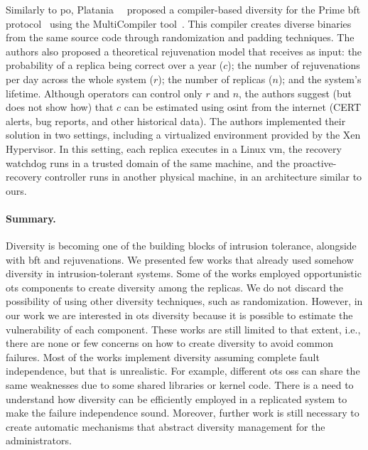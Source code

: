 Similarly to \gls{po}, Platania~\etal{}~\cite{Platania:2014} proposed a compiler-based diversity for the Prime \gls{bft} protocol~\cite{Amir:2011} using the MultiCompiler tool~\cite{Homescu:2013}. 
This compiler creates diverse binaries from the same source code through randomization and padding techniques.
The authors also proposed a theoretical rejuvenation model that receives as input: the probability of a replica being correct over a year ($c$); the number of rejuvenations per day across the whole system ($r$); the number of replicas ($n$); and the system's lifetime. 
Although operators can control only $r$ and $n$, the authors suggest (but does not show how) that $c$ can be estimated using \gls{osint} from the internet (CERT alerts, bug reports, and other historical data).
The authors implemented their solution in two settings, including a virtualized environment provided by the Xen Hypervisor.
In this setting, each replica executes in a Linux \gls{vm}, the recovery watchdog runs in a trusted domain of the same machine, and the proactive-recovery controller runs in another physical machine, in an architecture similar to ours.


\paragraph{Summary.} 
Diversity is becoming one of the building blocks of intrusion tolerance, alongside with \gls{bft} and rejuvenations. 
We presented few works that already used somehow diversity in intrusion-tolerant systems. Some of the works employed opportunistic \gls{ots} components to create diversity among the replicas. 
We do not discard the possibility of using other diversity techniques, such as randomization. 
However, in our work we are interested in \gls{ots} diversity because it is possible to estimate the vulnerability of each component. 
These works are still limited to that extent, i.e., there are none or few concerns on how to create diversity to avoid common failures. 
Most of the works implement diversity assuming complete fault independence, but that is unrealistic. 
For example, different \gls{ots} \glspl{os} can share the same weaknesses due to some shared libraries or kernel code. 
There is a need to understand how diversity can be efficiently employed in a replicated system to make the failure independence sound. 
Moreover, further work is still necessary to create automatic mechanisms that abstract diversity management for the administrators.



